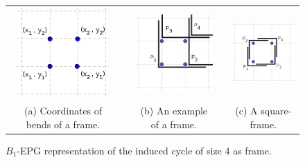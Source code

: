 
\begin{figure}[htb]
  \centering
  \begin{tabular}{c c c c c }
    \includegraphics[width=3.5cm]{./img/dispositionFrameInGrid}    
    & &
   \includegraphics[width=3.5cm]{./img/frame2} 
     & &
   \includegraphics[width=3.5cm]{./img/square2} \\%
   {\footnotesize (a) Coordinates of bends of a frame.}  
   & & {\footnotesize (b) An example of a frame.} 
   & & {\footnotesize (c) A square-frame.} %
  \end{tabular}
  \caption{$B_{1}$-EPG representation of the induced cycle of size 4 as frame.}\label{fig:frameInGrid}
\end{figure} 
